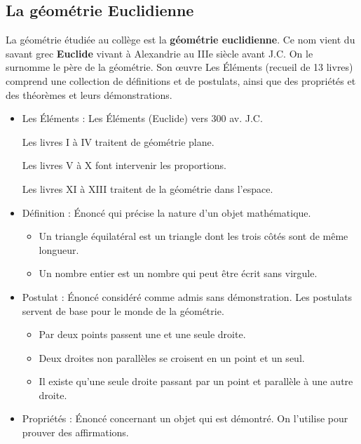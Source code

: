 \begin{pageCours}
\section{La géométrie Euclidienne}

\begin{His}
La géométrie étudiée au collège est la \textbf{géométrie euclidienne}. Ce nom vient du savant grec \textbf{Euclide} vivant à Alexandrie au IIIe siècle avant J.C. On le surnomme le père de la géométrie. Son œuvre \textcolor{sacado_orange}{Les Éléments} (recueil de 13 livres) comprend une collection de \textcolor{sacado_orange}{définitions} et de \textcolor{sacado_orange}{postulats}, ainsi que des \textcolor{sacado_orange}{propriétés} et des \textcolor{sacado_orange}{théorèmes} et leurs démonstrations.
\end{His}

\begin{Def}
\begin{itemize}
\item \textcolor{sacado_orange}{Les Éléments} : Les Éléments (Euclide) vers 300 av. J.C.

Les livres I à IV traitent de géométrie plane.

Les livres V à X font intervenir les proportions.

Les livres XI à XIII traitent de la géométrie dans l'espace.


\item \textcolor{sacado_orange}{Définition} : Énoncé qui précise la nature d'un objet mathématique.
\begin{Ex}
\begin{itemize}
\item Un triangle équilatéral est un triangle dont les trois côtés sont de même longueur.
\item Un nombre entier est un nombre qui peut être écrit sans virgule.
\end{itemize}
\end{Ex}
\item \textcolor{sacado_orange}{Postulat} : Énoncé considéré comme admis sans démonstration. Les postulats servent de base pour le monde de la géométrie.
\begin{Ex}
\begin{itemize}
\item Par deux points passent une et une seule droite.
\item Deux droites non parallèles se croisent en un point et un seul.
\item Il existe qu'une seule droite passant par un point et parallèle à une autre droite.
\end{itemize}
\end{Ex}
\item \textcolor{sacado_orange}{Propriétés} : Énoncé concernant un objet qui est démontré. On l'utilise pour prouver des affirmations.


\end{itemize}
\end{Def}
\end{pageCours}
